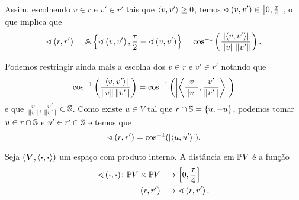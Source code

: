 Assim, escolhendo $v \in r$ e $v' \in r'$ tais que $\inte{v}{v'} \geq 0$, temos $\ang{v}{v'} \in \intff{0}{\frac{\tau}{4}}$, o que implica que
	\begin{equation*}
	\ang{r}{r'} = \min \left\{ \ang{v}{v'}, \frac{\tau}{2} - \ang{v}{v'} \right\} = \cos\inv \left( \frac{\abs{\inte{v}{v'}}}{\nor{v}\nor{v'}} \right).
	\end{equation*}

Podemos restringir ainda mais a escolha dos $v \in r$ e $v' \in r'$ notando que
	\begin{equation*}
	\cos\inv \left( \frac{\abs{\inte{v}{v'}}}{\nor{v}\nor{v'}} \right) = \cos\inv \left( \abs{\inte{\frac{v}{\nor{v}}}{\frac{v'}{\nor{v'}}}} \right)
	\end{equation*}
e que $\frac{v}{\nor{v}},\frac{v'}{\nor{v'}} \in \S$. Como existe $u \in V$ tal que $r \cap \S = \{u,-u\}$, podemos tomar $u \in r \cap \S$ e $u' \in r' \cap \S$ e temos que
	\begin{equation*}
	\ang{r}{r'} = \cos\inv (\abs{\inte{u}{u'}}).
	\end{equation*}

\begin{definition}
Seja $(\bm V,\inte{\var}{\var})$ um espaço com produto interno. A distância em $\pro V$ é a função
	\begin{align*}
	\func{\ang{\var}{\var}}{\pro V \times \pro V}{\intff{0}{\frac{\tau}{4}}}{(r,r')}{\ang{r}{r'}}.
	\end{align*}
\end{definition}

